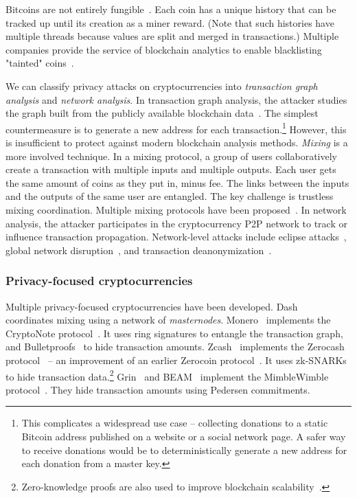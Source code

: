 Bitcoins are not entirely fungible~\cite{Reid2011,Androulaki2013}.
Each coin has a unique history that can be tracked up until its creation as a miner reward.
(Note that such histories have multiple threads because values are split and merged in transactions.)
Multiple companies provide the service of blockchain analytics to enable blacklisting "tainted" coins~\cite{Elliptic, Chainalysis}.

We can classify privacy attacks on cryptocurrencies into \textit{transaction graph analysis} and \textit{network analysis}.
In transaction graph analysis, the attacker studies the graph built from the publicly available blockchain data~\cite{Meiklejohn2013, Ober2013, Ron2013}.
The simplest countermeasure is to generate a new address for each transaction.\footnote{This complicates a widespread use case -- collecting donations to a static Bitcoin address published on a website or a social network page. A safer way to receive donations would be to deterministically generate a new address for each donation from a master key.}
However, this is insufficient to protect against modern blockchain analysis methods.
\textit{Mixing} is a more involved technique.
In a mixing protocol, a group of users collaboratively create a transaction with multiple inputs and multiple outputs.
Each user gets the same amount of coins as they put in, minus fee.
The links between the inputs and the outputs of the same user are entangled.
The key challenge is trustless mixing coordination.
Multiple mixing protocols have been proposed~\cite{Maxwell2013, Bonneau2014, Ruffing2014, Valenta2015}.
In network analysis, the attacker participates in the cryptocurrency P2P network to track or influence transaction propagation.
Network-level attacks include eclipse attacks~\cite{Marcus2018, Henningsen2019}, global network disruption~\cite{Apostolaki2017}, and transaction deanonymization~\cite{Biryukov2014}.


\subsubsection*{Privacy-focused cryptocurrencies}

Multiple privacy-focused cryptocurrencies have been developed.
Dash~\cite{Dash} coordinates mixing using a network of \textit{masternodes}.
Monero~\cite{Monero} implements the CryptoNote protocol~\cite{Saberhagen2013}.
It uses ring signatures to entangle the transaction graph, and Bulletproofs~\cite{Buenz2018} to hide transaction amounts.
Zcash~\cite{Zcash} implements the Zerocash protocol~\cite{BenSasson2014, Hopwood2020} -- an improvement of an earlier Zerocoin protocol~\cite{Miers2013}.
It uses zk-SNARKs~\cite{BenSasson2014a} to hide transaction data.\footnote{Zero-knowledge proofs are also used to improve blockchain scalability~\cite{Bonneau2020}.}
Grin~\cite{Grin} and BEAM~\cite{Beam} implement the MimbleWimble protocol~\cite{Jedusor2016}.
They hide transaction amounts using Pedersen commitments.

